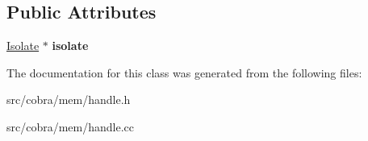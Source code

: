 \subsection*{Public Attributes}
\begin{DoxyCompactItemize}
\item 
\hypertarget{class_cobra_1_1internal_1_1_handle_a1e0b8e3eeffa8d7e9fd85ae2f3559aa7}{\hyperlink{class_cobra_1_1internal_1_1_isolate}{Isolate} $\ast$ {\bfseries isolate}}\label{class_cobra_1_1internal_1_1_handle_a1e0b8e3eeffa8d7e9fd85ae2f3559aa7}

\end{DoxyCompactItemize}


The documentation for this class was generated from the following files\+:\begin{DoxyCompactItemize}
\item 
src/cobra/mem/handle.\+h\item 
src/cobra/mem/handle.\+cc\end{DoxyCompactItemize}
